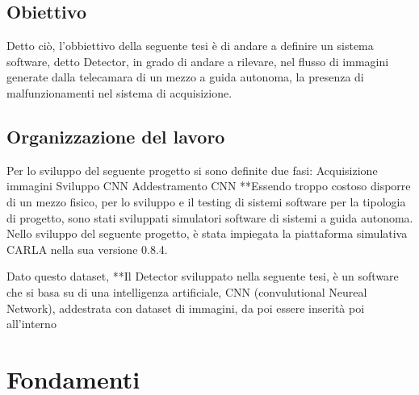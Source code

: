 \documentclass[14pt]{extarticle}
\begin{document}
\subsection{Obiettivo}
Detto ciò, l'obbiettivo della seguente tesi è di andare a definire un sistema software, detto Detector, in grado di andare a rilevare, nel flusso di immagini generate dalla telecamara di un mezzo a guida autonoma, la presenza di malfunzionamenti nel sistema di acquisizione. 
\subsection{Organizzazione del lavoro} 
Per lo sviluppo del seguente progetto si sono definite due fasi:
Acquisizione immagini
Sviluppo CNN
Addestramento CNN
**Essendo troppo costoso disporre di un mezzo fisico, per lo sviluppo e il testing di sistemi software per la tipologia di progetto, sono stati sviluppati simulatori software di sistemi a guida autonoma. Nello sviluppo del seguente progetto, è stata impiegata la  piattaforma simulativa CARLA nella sua versione 0.8.4.

Dato questo dataset,  
**Il Detector sviluppato nella seguente tesi, è un software che si basa su di una intelligenza artificiale, CNN (convulutional Neureal Network), addestrata con dataset di immagini, da poi essere inserità poi all'interno 
\section{Fondamenti}
\end{document}
